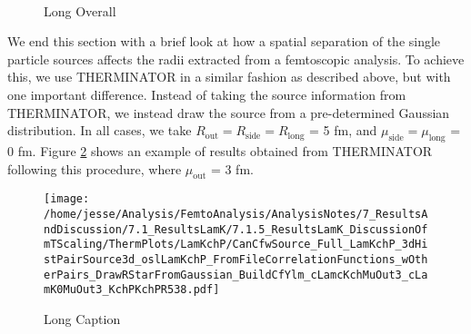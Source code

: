 \documentclass[/home/jesse/Analysis/FemtoAnalysis/AnalysisNotes/AnalysisNoteJBuxton.tex]{subfiles}
\begin{document}
\begin{figure}[h!]
  \centering
   \\
  \caption[Short Overall]{Long Overall}
  \label{fig:LamKchP_StdThermSources}
\end{figure}




We end this section with a brief look at how a spatial separation of the single particle sources affects the radii extracted from a femtoscopic analysis.
To achieve this, we use THERMINATOR in a similar fashion as described above, but with one important difference.
Instead of taking the source information from THERMINATOR, we instead draw the source from a pre-determined Gaussian distribution.
In all cases, we take $R_{\mathrm{out}} = R_{\mathrm{side}} = R_{\mathrm{long}}$ = 5 fm, and $\mu_{\mathrm{side}} = \mu_{\mathrm{long}}$ = 0 fm.
Figure \ref{fig:LamKchP_ThermSources_GaussianSourceEx} shows an example of results obtained from THERMINATOR following this procedure, where $\mu_{\mathrm{out}}$ = 3 fm.









\begin{figure}[h]
  \centering
  \texttt{[image: /home/jesse/Analysis/FemtoAnalysis/AnalysisNotes/7\_ResultsAndDiscussion/7.1\_ResultsLamK/7.1.5\_ResultsLamK\_DiscussionOfmTScaling/ThermPlots/LamKchP/CanCfwSource\_Full\_LamKchP\_3dHistPairSource3d\_oslLamKchP\_FromFileCorrelationFunctions\_wOtherPairs\_DrawRStarFromGaussian\_BuildCfYlm\_cLamcKchMuOut3\_cLamK0MuOut3\_KchPKchPR538.pdf]}
  \caption[Short Caption]{Long Caption}
  \label{fig:LamKchP_ThermSources_GaussianSourceEx}
\end{figure}
\end{document}
